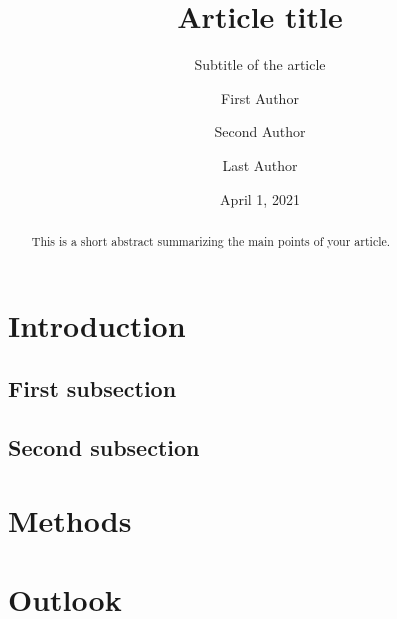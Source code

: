 \documentclass[
  english,        %
  font=times,     %
  twocolumn,      %
]{tumarticle}
\title{Article title}
\subtitle{Subtitle of the article}
\author[affil=1, orcid=1111-222-33333, email=first.author@tum.de]{First Author}
\author[affil=2]{Second Author}
\author[affil=1]{Last Author}
\affil[mark=1]{\theDepartmentName, \theUniversityName}
\affil[mark=2]{Another affiliation}
\date{April 1, 2021}
\begin{document}
\maketitle

\begin{abstract}
  This is a short abstract summarizing the main points of your article.
\end{abstract}

\section{Introduction}
\lipsum[1]
\subsection{First subsection}
\lipsum[2]
\subsection{Second subsection}
\lipsum[3]

\section{Methods}
\lipsum[4-5]

\section{Outlook}
\lipsum[6]
\end{document}

